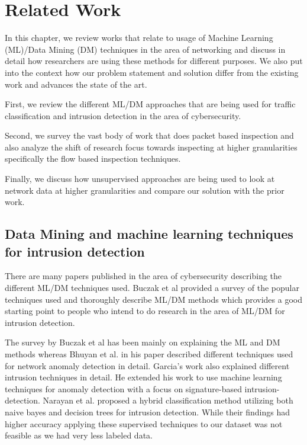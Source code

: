 
\chapter{Related Work}

In this chapter, we review works that relate to usage of Machine Learning (ML)/Data Mining (DM) techniques in the area of networking and discuss in detail how researchers are using these methods for different purposes. We also put into the context how our problem statement and solution differ from the existing work and advances the state of the art.

First, we review the different ML/DM approaches that are being used for traffic classification and intrusion detection in the area of cybersecurity.

Second, we survey the vast body of work that does packet based inspection and also analyze the shift of research focus towards inspecting at higher granularities specifically the flow based inspection techniques.

Finally, we discuss how unsupervised approaches are being used to look at network data at higher granularities and compare our solution with the prior work. 



\section{Data Mining and machine learning techniques for intrusion detection}

There are many papers published in the area of cybersecurity describing the different ML/DM techniques used. Buczak et al \cite{buczak2016survey} provided a survey of  the popular techniques used and thoroughly describe ML/DM methods which provides a good starting point to people who intend to do research in the area of ML/DM for intrusion detection.

The survey by Buczak et al \cite{buczak2016survey} has been mainly on explaining the ML and DM methods whereas Bhuyan et al. \cite{bhuyan2014network} in his paper described different techniques used for network anomaly detection in detail. Garcia's work \cite{garcia2009anomaly} also explained different intrusion techniques in detail. He extended his work to  use machine learning techniques for anomaly detection with a focus on signature-based intrusion-detection.
Narayan et al. \cite{peddabachigari2007modeling} proposed a hybrid classification method utilizing both naive bayes and decision trees for intrusion detection. While their findings had higher accuracy applying these supervised techniques to our dataset was not feasible as we had very less labeled data.

